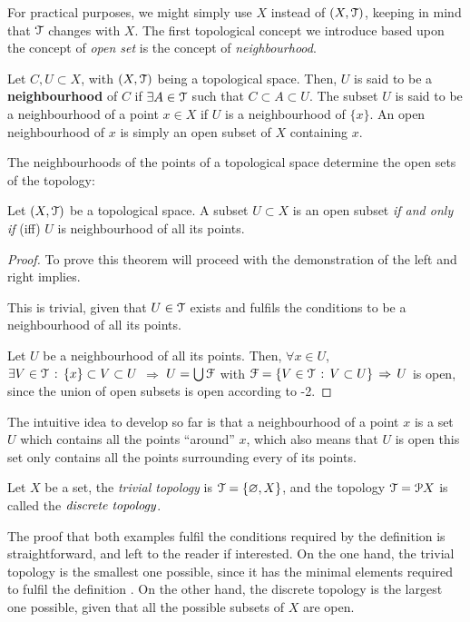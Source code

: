 For practical purposes, we might simply use $X$ instead of $(X, \EuScript{T})$, keeping in mind that $\EuScript{T}$ changes with $X$. 
%
The first topological concept we introduce based upon the concept of \emph{open set} is the concept of \emph{neighbourhood}.

\begin{definition}
Let $C, U\subset X$, with $(X, \EuScript{T})$ being a topological space. Then, $U$ is said to be a \textbf{neighbourhood} of $C$ if $\exists A\in\EuScript{T}$ such that $C\subset A \subset U$. The subset $U$ is said to be a neighbourhood of a point $x\in X$ if $U$ is a neighbourhood of $\{x\}$. An open neighbourhood of $x$ is simply an open subset of $X$ containing $x$. 
\label{def:neighbourhood}
\end{definition}

The neighbourhoods of the points of a topological space determine the open sets of the topology:

\begin{theorem}
Let $(X, \EuScript{T})$ be a topological space. A subset $U\subset X$ is an open subset \emph{if and only if} (iff) $U$ is neighbourhood of all its points.
\end{theorem}
\begin{proof} To prove this theorem will proceed with the demonstration of the left and right implies.

\noindent{$\boxed{\Rightarrow}$} This is trivial, given that $U\in\EuScript{T}$ exists and fulfils the conditions to be a neighbourhood of all its points.

\noindent{$\boxed{\Leftarrow}$} Let $U$ be a neighbourhood of all its points. Then, $\forall x\in U$, $\exists V\in \EuScript{T}\,:\,\{x\}\subset V\subset U$ $\Rightarrow$ $U = \bigcup\EuScript{F}$ with $\EuScript{F}=\{V\in\EuScript{T}\,:\,V\subset U\}\,\Rightarrow\,U$ is open, since the union of open subsets is open according to -2.
\end{proof}

The intuitive idea to develop so far is that a neighbourhood of a point $x$ is a set $U$ which contains all the points ``around'' $x$, which also means that $U$ is open \iff this set only contains all the points surrounding every of its points.

\begin{example}
Let $X$ be a set, the \emph{trivial topology} is $\EuScript{T}=\{\varnothing, X\}$, and the topology $\EuScript{T}=\EuScript{P} X$ is called the $\emph{discrete topology}$.
\end{example}

The proof that both examples fulfil the conditions required by the definition  is straightforward, and left to the reader if interested. On the one hand, the trivial topology is the smallest one possible, since it has the minimal elements required to fulfil the definition . On the other hand, the discrete topology is the largest one possible, given that all the possible subsets of $X$ are open.

